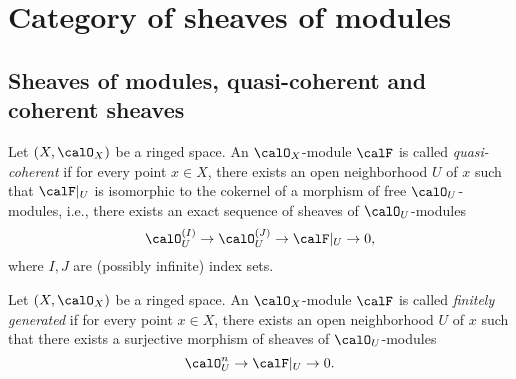 \section{Category of sheaves of modules}

\subsection{Sheaves of modules, quasi-coherent and coherent sheaves}



    \begin{definition}\label{def:quasi-coherent_sheaf}
        Let \((X,\calO_X)\) be a ringed space.
        An \(\calO_X\)-module \(\calF\) is called \emph{quasi-coherent} if for every point \(x\in X\), there exists an open neighborhood \(U\) of \(x\) such that \(\calF|_U\) is isomorphic to the cokernel of a morphism of free \(\calO_U\)-modules, i.e., there exists an exact sequence of sheaves of \(\calO_U\)-modules
        \[
            \calO_U^{(I)} \to \calO_U^{(J)} \to \calF|_U \to 0,
        \]
        where \(I,J\) are (possibly infinite) index sets.
    \end{definition}

    \begin{definition}\label{def:finitely_generated_sheaf}
        Let \((X,\calO_X)\) be a ringed space.
        An \(\calO_X\)-module \(\calF\) is called \emph{finitely generated} if for every point \(x\in X\), there exists an open neighborhood \(U\) of \(x\) such that there exists a surjective morphism of sheaves of \(\calO_U\)-modules
        \[
            \calO_U^n \to \calF|_U \to 0.
        \]
    \end{definition}

